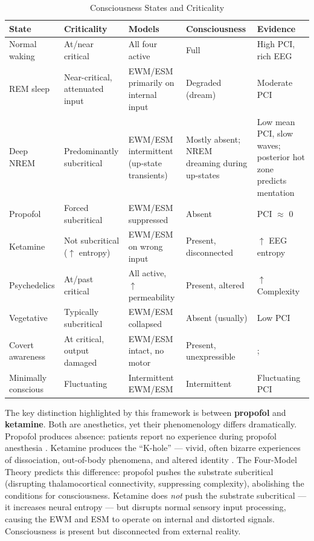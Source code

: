 \documentclass[12pt]{article}
\begin{document}
\begin{table}[H]
\caption{Consciousness States and Criticality}
\centering
\small
\begin{tabularx}{\textwidth}{lXXXX}
\toprule
\textbf{State} & \textbf{Criticality} & \textbf{Models} & \textbf{Consciousness} & \textbf{Evidence} \\
\midrule
Normal waking & At/near critical & All four active & Full & High PCI, rich EEG \\
REM sleep & Near-critical, attenuated input & EWM/ESM primarily on internal input & Degraded (dream) & Moderate PCI \\
Deep NREM & Predominantly subcritical & EWM/ESM intermittent (up-state transients) & Mostly absent; NREM dreaming during up-states & Low mean PCI, slow waves; posterior hot zone predicts mentation \citep{Siclari2017} \\
Propofol & Forced subcritical & EWM/ESM suppressed & Absent & PCI $\approx$ 0 \\
Ketamine & Not subcritical ($\uparrow$ entropy) & EWM/ESM on wrong input & Present, disconnected & $\uparrow$ EEG entropy \\
Psychedelics & At/past critical & All active, $\uparrow$ permeability & Present, altered & $\uparrow$ Complexity \\
Vegetative & Typically subcritical & EWM/ESM collapsed & Absent (usually) & Low PCI \\
Covert awareness & At critical, output damaged & EWM/ESM intact, no motor & Present, unexpressible & \citet{Owen2006}; \citet{Toker2026} \\
Minimally conscious & Fluctuating & Intermittent EWM/ESM & Intermittent & Fluctuating PCI \\
\bottomrule
\end{tabularx}
\end{table}


The key distinction highlighted by this framework is between \textbf{propofol} and \textbf{ketamine}. Both are anesthetics, yet their phenomenology differs dramatically. Propofol produces absence: patients report no experience during propofol anesthesia \citep{AlkireHudetzTononi2008,Boly2012}. Ketamine produces the ``K-hole'' --- vivid, often bizarre experiences of dissociation, out-of-body phenomena, and altered identity \citep{Corlett2011}. The Four-Model Theory predicts this difference: propofol pushes the substrate subcritical (disrupting thalamocortical connectivity, suppressing complexity), abolishing the conditions for consciousness. Ketamine does \emph{not} push the substrate subcritical --- it increases neural entropy \citep{Schartner2017} --- but disrupts normal sensory input processing, causing the EWM and ESM to operate on internal and distorted signals. Consciousness is present but disconnected from external reality.
\end{document}

